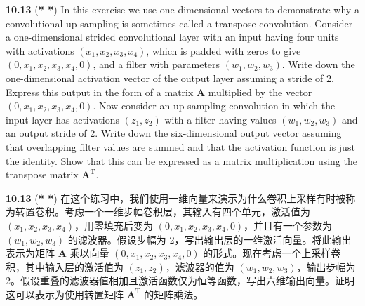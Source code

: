 \documentclass{article}
\begin{document}
\textbf{10.13} (\textbf{* *}) In this exercise we use one-dimensional vectors to demonstrate why a convolutional up-sampling is sometimes called a transpose convolution. Consider a one-dimensional strided convolutional layer with an input having four units with activations $(x_1, x_2, x_3, x_4)$, which is padded with zeros to give $(0, x_1, x_2, x_3, x_4, 0)$, and a filter with parameters $(w_1, w_2, w_3)$. Write down the one-dimensional activation vector of the output layer assuming a stride of 2. Express this output in the form of a matrix $\mathbf{A}$ multiplied by the vector $(0, x_1, x_2, x_3, x_4, 0)$. Now consider an up-sampling convolution in which the input layer has activations $(z_1, z_2)$ with a filter having values $(w_1, w_2, w_3)$ and an output stride of 2. Write down the six-dimensional output vector assuming that overlapping filter values are summed and that the activation function is just the identity. Show that this can be expressed as a matrix multiplication using the transpose matrix $\mathbf{A}^\mathrm{T}$.

\textbf{10.13} (\textbf{* *}) 在这个练习中，我们使用一维向量来演示为什么卷积上采样有时被称为转置卷积。考虑一个一维步幅卷积层，其输入有四个单元，激活值为 $(x_1, x_2, x_3, x_4)$，用零填充后变为 $(0, x_1, x_2, x_3, x_4, 0)$，并且有一个参数为 $(w_1, w_2, w_3)$ 的滤波器。假设步幅为 2，写出输出层的一维激活向量。将此输出表示为矩阵 $\mathbf{A}$ 乘以向量 $(0, x_1, x_2, x_3, x_4, 0)$ 的形式。现在考虑一个上采样卷积，其中输入层的激活值为 $(z_1, z_2)$，滤波器的值为 $(w_1, w_2, w_3)$，输出步幅为 2。假设重叠的滤波器值相加且激活函数仅为恒等函数，写出六维输出向量。证明这可以表示为使用转置矩阵 $\mathbf{A}^\mathrm{T}$ 的矩阵乘法。
\end{document}
